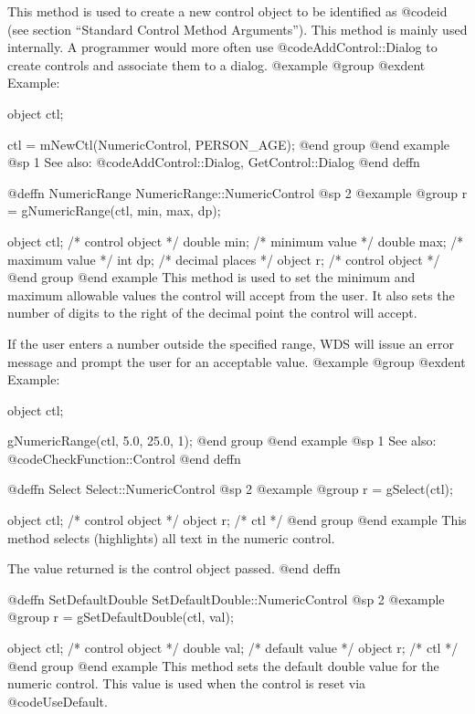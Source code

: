 This method is used to create a new control object to be identified as
@code{id} (see section ``Standard Control Method Arguments'').  This
method is mainly used internally.  A programmer would more often
use @code{AddControl::Dialog} to create controls and associate them
to a dialog.
@example
@group
@exdent Example:

object  ctl;

ctl = mNewCtl(NumericControl, PERSON_AGE);
@end group
@end example
@sp 1
See also:  @code{AddControl::Dialog, GetControl::Dialog}
@end deffn









@deffn {NumericRange} NumericRange::NumericControl
@sp 2
@example
@group
r = gNumericRange(ctl, min, max, dp);

object  ctl;   /*  control object  */
double  min;   /*  minimum value   */
double  max;   /*  maximum value   */
int     dp;    /*  decimal places  */
object  r;     /*  control object  */
@end group
@end example
This method is used to set the minimum and maximum allowable values
the control will accept from the user.  It also sets the number of
digits to the right of the decimal point the control will accept.

If the user enters a number outside the specified range, WDS will
issue an error message and prompt the user for an acceptable value.
@example
@group
@exdent Example:

object  ctl;

gNumericRange(ctl, 5.0, 25.0, 1);
@end group
@end example
@sp 1
See also:  @code{CheckFunction::Control}
@end deffn



@deffn {Select} Select::NumericControl
@sp 2
@example
@group
r = gSelect(ctl);

object  ctl;   /*  control object  */
object  r;     /*  ctl             */
@end group
@end example
This method selects (highlights) all text in the numeric control.

The value returned is the control object passed.
@end deffn



@deffn {SetDefaultDouble} SetDefaultDouble::NumericControl
@sp 2
@example
@group
r = gSetDefaultDouble(ctl, val);

object  ctl;    /*  control object   */
double  val;    /*  default value    */
object  r;      /*  ctl              */
@end group
@end example
This method sets the default double value for the numeric control.
This value is used when the control is reset via @code{UseDefault}.

